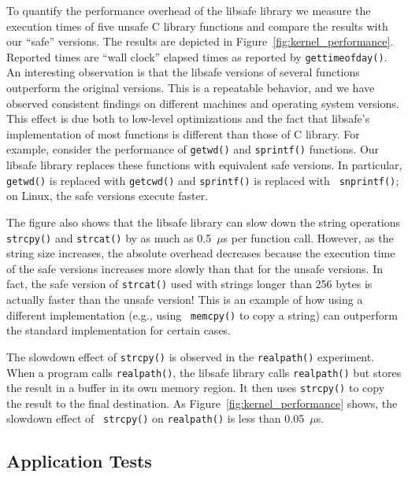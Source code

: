 \documentclass[]{article}
\begin{document}
To quantify the performance overhead of the libsafe library we measure
the execution times of five unsafe C library functions and compare the
results with our ``safe'' versions.  The results are depicted in
Figure~\ref{fig:kernel_performance}.  Reported times are ``wall
clock'' elapsed times as reported by {\tt gettimeofday()}.  An
interesting observation is that the libsafe versions of several
functions outperform the original versions.  This is a repeatable
behavior, and we have observed consistent findings on different
machines and operating system versions.  This effect is due both to
low-level optimizations and the fact that libsafe's implementation of
most functions is different than those of C library.  For example,
consider the performance of {\tt getwd()} and {\tt sprintf()}
functions.  Our libsafe library replaces these functions with
equivalent safe versions.  In particular, {\tt getwd()} is replaced
with {\tt getcwd()} and {\tt sprintf()} is replaced with {\tt
snprintf()}; on Linux, the safe versions execute faster.

The figure also shows that the libsafe library can slow down the
string operations {\tt strcpy()} and {\tt strcat()} by as much as
0.5~$\mu$s per function call.  However, as the string size increases,
the absolute overhead decreases because the execution time of the safe
versions increases more slowly than that for the unsafe versions.  In
fact, the safe version of {\tt strcat()} used with strings longer than
256 bytes is actually faster than the unsafe version!  This is an
example of how using a different implementation (e.g., using {\tt
memcpy()} to copy a string) can outperform the standard implementation
for certain cases.

The slowdown effect of {\tt strcpy()} is observed in the {\tt realpath()}
experiment.  When a program calls {\tt realpath()}, the libsafe library calls
{\tt realpath()} but stores the result in a buffer in its own memory region.
It then uses {\tt strcpy()} to copy the result to the final destination.  As
Figure~\ref{fig:kernel_performance} shows, the slowdown effect of {\tt
strcpy()} on {\tt realpath()} is less than 0.05~$\mu$s.


\subsection{Application Tests}
\label{sec:applicaton_tests}
\end{document}
